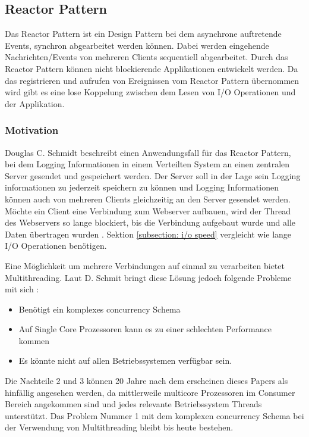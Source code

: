 \subsection{Reactor Pattern}
\label{section:Reactor Pattern}

Das Reactor Pattern ist ein Design Pattern bei dem asynchrone auftretende Events, synchron abgearbeitet werden können. Dabei werden eingehende Nachrichten/Events von mehreren Clients sequentiell abgearbeitet. Durch das Reactor Pattern können nicht blockierende Applikationen entwickelt werden. Da das registrieren und aufrufen von Ereignissen vom Reactor Pattern übernommen wird gibt es eine lose Koppelung zwischen dem Lesen von I/O Operationen und der Applikation. \cite[p. 1]{Sch95}


\subsubsection{Motivation}
\label{section:reactor_motivation}

Douglas C. Schmidt beschreibt einen Anwendungsfall für das Reactor Pattern, bei dem Logging Informationen in einem Verteilten System an einen zentralen Server gesendet und gespeichert werden. Der Server soll in der Lage sein Logging informationen zu jederzeit speichern zu können und Logging Informationen können auch von mehreren Clients gleichzeitig an den Server gesendet werden. Möchte ein Client eine Verbindung zum Webserver aufbauen, wird der Thread des Webservers so lange blockiert, bis die Verbindung aufgebaut wurde und alle Daten übertragen wurden \cite[p. 1]{Sch95}. Sektion \ref{subsection: i/o speed} vergleicht wie lange I/O Operationen benötigen.

Eine Möglichkeit um mehrere Verbindungen auf einmal zu verarbeiten bietet Multithreading. Laut D. Schmit bringt diese Lösung jedoch folgende Probleme mit sich \cite[p. 2]{Sch95}:

\begin{itemize}
  \item Benötigt ein komplexes concurrency Schema
  \item Auf Single Core Prozessoren kann es zu einer schlechten Performance kommen
  \item Es könnte nicht auf allen Betriebssystemen verfügbar sein.
\end{itemize}

Die Nachteile 2 und 3 können 20 Jahre nach dem erscheinen dieses Papers als hinfällig angesehen werden, da mittlerweile multicore Prozessoren im Consumer Bereich angekommen sind und jedes relevante Betriebssystem Threads unterstützt. Das Problem Nummer 1 mit dem komplexen concurrency Schema bei der Verwendung von Multithreading bleibt bis heute bestehen.

